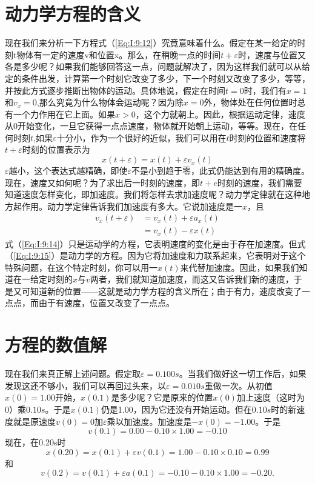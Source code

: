 \section{动力学方程的含义}

现在我们来分析一下方程式（\ref{Eq:I:9:12}）究竟意味着什么。假定在某一给定的时刻t物体有一定的速度v和位置x。那么，在稍晚一点的时间$t+\varepsilon $时，速度与位置又各是多少呢？如果我们能够回答这一点，问题就解决了，因为这样我们就可以从给定的条件出发，计算第一个时刻它改变了多少，下一个时刻又改变了多少，等等，并按此方式逐步推断出物体的运动。具体地说，假定在时间$t=0$时，我们有$x=1$和$v_x=0$,那么究竟为什么物体会运动呢？因为除$x=0$外，物体处在任何位置时总有一个力作用在它上面。如果$x>0$，这个力就朝上。因此，根据运动定律，速度从0开始变化，一旦它获得一点点速度，物体就开始朝上运动，等等。现在，在任何时刻$t$,如果$\varepsilon $十分小，作为一个很好的近似，我们可以用在$t$时刻的位置和速度将$t+\varepsilon $时刻的位置表示为
\begin{equation}
    \label{Eq:I:9:13}
    x(t+\varepsilon)=x(t)+\varepsilon v_x(t)
\end{equation}
$\varepsilon $越小，这个表达式越精确，即使$\varepsilon $不是小到趋于零，此式仍能达到有用的精确度。现在，速度又如何呢？为了求出后一时刻的速度，即$t+e$时刻的速度，我们需要知道速度怎样变化，即加速度。我们将怎样去求加速度呢？动力学定律就在这种地方起作用。动力学定律告诉我们加速度有多大。它说加速度是一$x$，且
\begin{align}
    \label{Eq:I:9:14}
    v_x(t+\varepsilon)&=v_x(t)+\varepsilon a_x(t) \\
    \label{Eq:I:9:15}
    &=v_x(t)-\varepsilon x(t)
\end{align}
式（\ref{Eq:I:9:14}）只是运动学的方程，它表明速度的变化是由于存在加速度。但式（\ref{Eq:I:9:15}）是动力学的方程。因为它将加速度和力联系起来，它表明对于这个特殊问题，在这个特定时刻，你可以用一$x(t)$来代替加速度。因此，如果我们知道在一给定时刻的$x$与$v$两者，我们就知道加速度，而这又告诉我们新的速度，于是又可知道新的位置——这就是动力学方程的含义所在；由于有力，速度改变了一点点，而由于有速度，位置又改变了一点点。

\section{方程的数值解}

现在我们来真正解上述问题。假定取$\varepsilon =0.100s$。当我们做好这一切工作后，如果发现这还不够小，我们可以再回过头来，以$\varepsilon =0.010s$重做一次。从初值$x(0)=1.00$开始，$x(0.1)$是多少呢？它是原来的位置$x(0)$加上速度（这时为0）乘$0.10s$。于是$x(0.1)$仍是1.00，因为它还没有开始运动。但在$0.10s$时的新速度就是原速度$v(0)=0$加$\varepsilon $乘以加速度。加速度是$-x(0)=-1.00$。于是
\begin{equation*}
    v(0.1)=0.00-0.10 \times 1.00 = -0.10
\end{equation*}
现在，在0.20s时
\begin{equation*}
x(0.20)=x(0.1)+\varepsilon v(0.1)=1.00-0.10 \times 0.10=0.99
\end{equation*}
和
\begin{equation*}
v(0.2)=v(0.1)+\varepsilon a(0.1)=-0.10-0.10 \times 1.00=-0.20.
\end{equation*}

